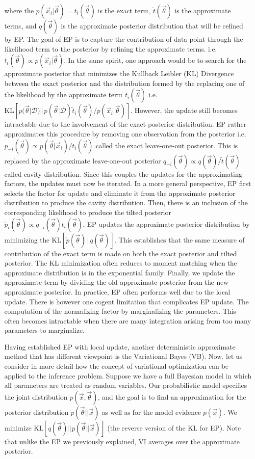 \documentclass[]{article}
\begin{document}
where the $p(\vec{x}_i|\vec{\theta}) = t_i(\vec{\theta})$ is the exact term, $\tilde{t}(\vec{\theta})$ is the approximate terms, and $q(\vec{\theta})$ is the approximate posterior distribution that will be refined by EP. The goal of EP is to capture the contribution of data point through the likelihood term to the posterior by refining the approximate terms. i.e. $t_i(\vec{\theta}) \propto p(\vec{x}_i|\vec{\theta}).$ In the same spirit, one approach would be to search for the approximate posterior that minimizes the Kullback Leibler (KL) Divergence between the exact posterior and the distribution formed by the replacing one of the likelihood by the approximate term $t_i(\vec{\theta})$ i.e. $\text{KL}[p(\vec{\theta}|\mathcal{D})||p(\vec{\theta}|\mathcal{D})\tilde{t}_i(\vec{\theta})/p(\vec{x}_i|\vec{\theta})]$. However, the update still becomes intractable due to the involvement of the exact posterior distribution. EP rather approximates this procedure by removing one observation from the posterior i.e. $p_{-i}(\vec{\theta}) \propto p(\vec{\theta}|\vec{x}_i)/t_i(\vec{\theta})$ called the exact leave-one-out posterior. This is replaced by the approximate leave-one-out posterior $q_{-i}(\vec{\theta}) \propto q(\vec{\theta})/\tilde{t}(\vec{\theta})$ called cavity distribution. Since this couples the updates for the approximating factors, the updates must now be iterated. In a more general perspective, EP first selects the factor for update and eliminate it from the approximate posterior distribution to produce the cavity distribution. Then, there is an inclusion of the corresponding likelihood to produce the tilted posterior $\tilde{p}_i(\vec{\theta}) \propto q_{-i}(\vec{\theta})t_i(\vec{\theta})$. EP updates the approximate posterior distribution by minimizing the $\text{KL}[\tilde{p}(\vec{\theta})||q(\vec{\theta})]$. This establishes that the same measure of contribution of the exact term is made on both the exact posterior and tilted posterior. The KL minimization often reduces to moment matching when the approximate distribution is in the exponential family. Finally, we update the approximate term by dividing the old approximate posterior from the new approximate posterior. In practice, EP often performs well due to the local update. There is however one cogent limitation that complicates EP update. The computation of the normalizing factor by marginalizing the parameters. This often becomes intractable when there are many integration arising from too many parameters to marginalize. \par Having established EP with local update, another deterministic approximate method that has different viewpoint is the Variational Bayes (VB). Now, let us consider in more detail how the concept of variational optimization can be applied to the inference problem. Suppose we have a full Bayesian model in which all parameters are treated as random variables. Our probabilistic model specifies the joint distribution $p(\vec{x},\vec{\theta})$, and the goal is to find an approximation for the posterior distribution $p(\vec{\theta}||\vec{x})$ as well as for the model evidence $p(\vec{x})$. We minimize $\text{KL}[q(\vec{\theta})||p(\vec{\theta}||\vec{x})]$ (the reverse version of the KL for EP). Note that unlike the EP we previously explained, VI averages over the approximate posterior.
\end{document}
